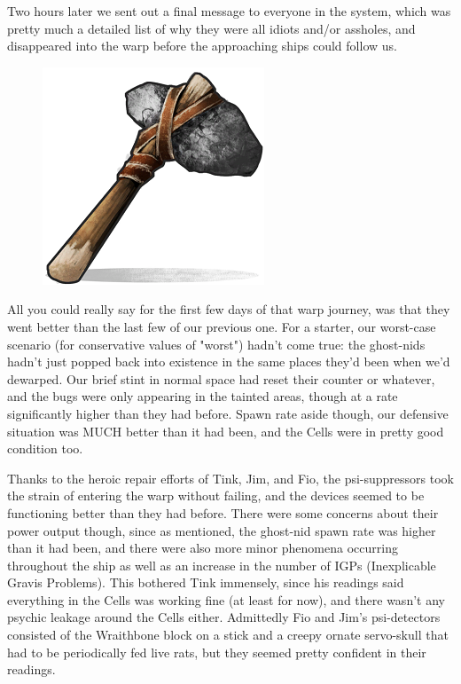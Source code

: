 Two hours later we sent out a final message to everyone in the system, which was pretty much a detailed list of why they were all idiots and/or assholes, and disappeared into the warp before the approaching ships could follow us.

\begin{figure}
	\begin{center}
		\includegraphics[width=\figwidth]{pics/15/34.png}
	\end{center}
\end{figure}
All you could really say for the first few days of that warp journey, was that they went better than the last few of our previous one. 
For a starter, our worst-case scenario (for conservative values of "worst") hadn't come true: 
the ghost-nids hadn't just popped back into existence in the same places they'd been when we'd dewarped. 
Our brief stint in normal space had reset their counter or whatever, and the bugs were only appearing in the tainted areas, though at a rate significantly higher than they had before. 
Spawn rate aside though, our defensive situation was MUCH better than it had been, and the Cells were in pretty good condition too. 


Thanks to the heroic repair efforts of Tink, Jim, and Fio, the psi-suppressors took the strain of entering the warp without failing, and the devices seemed to be functioning better than they had before. 
There were some concerns about their power output though, since as mentioned, the ghost-nid spawn rate was higher than it had been, and there were also more minor phenomena occurring throughout the ship as well as an increase in the number of IGPs (Inexplicable Gravis Problems). 
This bothered Tink immensely, since his readings said everything in the Cells was working fine (at least for now), and there wasn't any psychic leakage around the Cells either. 
Admittedly Fio and Jim's psi-detectors consisted of the Wraithbone block on a stick and a creepy ornate servo-skull that had to be periodically fed live rats, but they seemed pretty confident in their readings.

